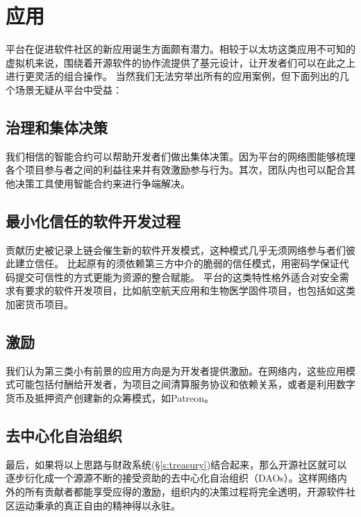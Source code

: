 \section{应用}

\Oscoin{}平台在促进软件社区的新应用诞生方面颇有潜力。相较于以太坊这类应用不可知的虚拟机来说，\Oscoin{}围绕着开源软件的协作流提供了基元设计，让开发者们可以在此之上进行更灵活的组合操作。
当然我们无法穷举出\Oscoin{}所有的应用案例，但下面列出的几个场景无疑从\Oscoin{}平台中受益：

\subsection{治理和集体决策}

我们相信\oscoin{}的智能合约可以帮助开发者们做出集体决策。因为\oscoin{}平台的网络图能够梳理各个项目参与者之间的利益往来并有效激励参与行为。其次，团队内也可以配合其他决策工具使用智能合约来进行争端解决。

\subsection{最小化信任的软件开发过程}
贡献历史被记录上链会催生新的软件开发模式，这种模式几乎无须网络参与者们彼此建立信任。
比起原有的须依赖第三方中介的脆弱的信任模式，\oscoin{}用密码学保证代码提交可信性的方式更能为资源的整合赋能。
\oscoin{}平台的这类特性格外适合对安全需求有要求的软件开发项目，比如航空航天应用和生物医学固件项目，也包括如\oscoin{}这类加密货币项目。

\subsection{激励}
我们认为第三类小有前景的应用方向是为开发者提供激励。在\oscoin{}网络内，这些应用模式可能包括付酬给开发者，为项目之间清算服务协议和依赖关系，或者是利用数字货币及抵押资产创建新的众筹模式，如Patreon。

\subsection{去中心化自治组织}
最后，如果将以上思路与\oscoin{}财政系统(\S\ref{s:treasury})结合起来，那么开源社区就可以逐步衍化成一个源源不断的接受\oscoin{}资助的去中心化自治组织（DAOs）。这样网络内外的所有贡献者都能享受应得的激励，组织内的决策过程将完全透明，开源软件社区运动秉承的真正自由的精神得以永驻。